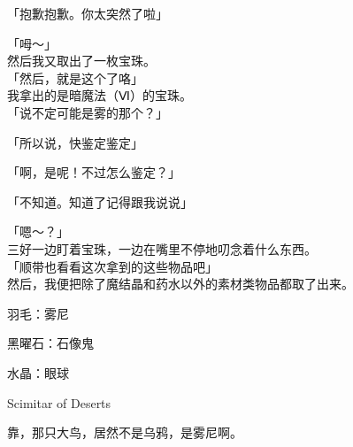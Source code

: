 「抱歉抱歉。你太突然了啦」

「呣～」\\

然后我又取出了一枚宝珠。\\

「然后，就是这个了咯」\\

我拿出的是暗魔法（Ⅵ）的宝珠。\\

「说不定可能是雾的那个？」

「所以说，快鉴定鉴定」

「啊，是呢！不过怎么鉴定？」

「不知道。知道了记得跟我说说」

「嗯～？」\\

三好一边盯着宝珠，一边在嘴里不停地叨念着什么东西。\\

「顺带也看看这次拿到的这些物品吧」\\

然后，我便把除了魔结晶和药水以外的素材类物品都取了出来。\\

\cardline

  羽毛：雾尼

  黑曜石：石像鬼

  水晶：眼球

  Scimitar of Deserts

\cardline

靠，那只大鸟，居然不是乌鸦，是雾尼啊。


